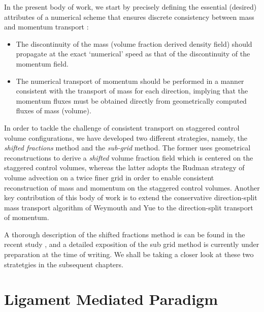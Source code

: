 
In the present body of work, we start by precisely defining the
essential (desired) attributes of a numerical scheme that 
ensures discrete consistency between mass and momentum transport : 

\begin{itemize}
	\item The discontinuity of the mass (volume fraction 
		derived density field) should propagate at the 
		exact `numerical' speed as that of 
		the discontinuity of the momentum field. 
	\item The numerical transport of momentum should be performed 
		in a manner consistent with the transport of mass for 
		each direction, implying that the momentum fluxes must 
		be obtained directly from geometrically 
		computed fluxes of mass (volume). 
\end{itemize}

In order to tackle the challenge of consistent transport on staggered control 
volume configurations, we have developed two different strategies, namely, 
the \textit{shifted fractions} method and the \textit{sub-grid} method. 
The former uses geometrical reconstructions to derive a 
\textit{shifted} volume fraction field which is centered on the staggered
control volumes, whereas the latter adopts the Rudman \cite{rudman1998volume} 
strategy of volume advection on a twice finer grid in order to 
enable consistent reconstruction of mass and momentum on the staggered control volumes. 
Another key contribution of this body of work is to extend the conservative 
direction-split mass transport algorithm of Weymouth and Yue  
to the direction-split transport of momentum. 

A thorough description of the shifted fractions method is can be found in
the recent study  , and a detailed exposition of the sub grid method 
is currently under preparation at the time of writing.  
We shall be taking a closer look at these two stratetgies in the subsequent chapters.  









\section*{Ligament Mediated Paradigm}





